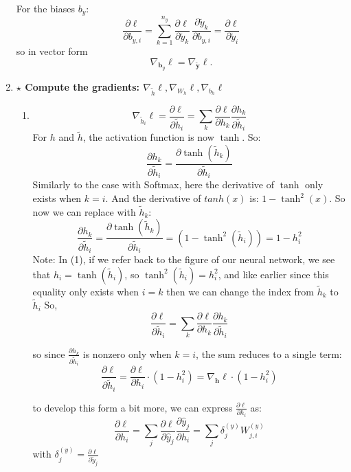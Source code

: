 \documentclass[12pt,a4paper]{article}
\begin{document}
\begin{enumerate}[resume]
    For the biases $b_y$:
    \[
    \frac{\partial \ell}{\partial b_{y,i}}
    = \sum_{k=1}^{n_y} \frac{\partial \ell}{\partial \tilde{y}_k}\,\frac{\partial \tilde{y}_k}{\partial b_{y,i}}
    = \frac{\partial \ell}{\partial \tilde{y}_i}
    \]
    so in vector form
    \[
    \nabla_{\mathbf{b}_y}\ell = \nabla_{\tilde{\mathbf{y}}}\ell .
    \]

    \item \textbf{$\star$ Compute the gradients: $\nabla_{\tilde{h}}\ell, \nabla_{W_h}\ell, \nabla_{b_h}\ell$}

    \begin{enumerate}
        \item \[ 
        \nabla_{\tilde{h}_i}\ell = \frac{\partial \ell}{\partial \tilde{h}_i}  
        = \sum_{k} \frac{\partial \ell}{\partial h_k} \frac{\partial h_k}{\partial \tilde{h}_i}
        \]
        For $h$ and $\tilde{h}$, the activation function is now $\tanh$. So:
        \[
        \frac{\partial h_k}{\partial \tilde{h}_i} = \frac{\partial \tanh(\tilde{h}_k)}{\partial \tilde{h}_i}
        \]
        Similarly to the case with Softmax, here the derivative of $\tanh$ only exists when $k=i$. And the derivative
        of $tanh(x)$ is: $1 - \tanh^2(x)$.
        So now we can replace with $\tilde{h}_k$:
        \[
        \frac{\partial h_k}{\partial \tilde{h}_i}
        = \frac{\partial \tanh(\tilde{h}_k)}{\partial \tilde{h}_i} \tag{1}
        = (1 - \tanh^2(\tilde{h}_i))
        = 1 - h_i^2
        \]
        Note: In (1), if we refer back to the figure of our neural network, we see that $h_i = \tanh(\tilde{h}_i)$, so $\tanh^2(\tilde{h}_i) = h_i^2$, 
        and like earlier since this equality only exists when $i=k$ then we can change the index 
        from $\tilde{h}_k$ to $\tilde{h}_i$ \newline
        So,
        \[
        \frac{\partial \ell}{\partial \tilde{h}_i}
        = \sum_k \frac{\partial \ell}{\partial h_k} \frac{\partial h_k}{\partial \tilde{h}_i}
        \]

        so since $\frac{\partial h_k}{\partial \tilde{h}_i}$ is nonzero only when $k = i$, the sum reduces to a single term:
        \[
        \frac{\partial \ell}{\partial \tilde{h}_i}
        = \frac{\partial \ell}{\partial h_i} \cdot (1 - h_i^2) 
        = \nabla_{\mathbf{h}}\ell \cdot (1 - h_i^2) 
        \]

        to develop this form a bit more, we can express $\frac{\partial \ell}{\partial h_i}$ as:
        \[
        \frac{\partial \ell}{\partial h_i} = \sum_j \frac{\partial \ell}{\partial \hat{y}_j} \frac{\partial \hat{y}_j}{\partial h_i}
        = \sum_j \delta_{j}^{(y)} W_{j,i}^{(y)} 
        \]
        with $\delta_{j}^{(y)} = \frac{\partial \ell}{\partial \tilde{y}_j}$


\end{enumerate}
\end{enumerate}
\end{document}
